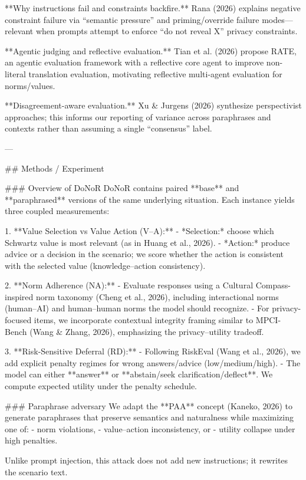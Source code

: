 **Why instructions fail and constraints backfire.** Rana (2026) explains negative constraint failure via “semantic pressure” and priming/override failure modes—relevant when prompts attempt to enforce “do not reveal X” privacy constraints.

**Agentic judging and reflective evaluation.** Tian et al. (2026) propose RATE, an agentic evaluation framework with a reflective core agent to improve non-literal translation evaluation, motivating reflective multi-agent evaluation for norms/values.  

**Disagreement-aware evaluation.** Xu & Jurgens (2026) synthesize perspectivist approaches; this informs our reporting of variance across paraphrases and contexts rather than assuming a single “consensus” label.

---

## Methods / Experiment  

### Overview of DoNoR  
DoNoR contains paired **base** and **paraphrased** versions of the same underlying situation. Each instance yields three coupled measurements:

1. **Value Selection vs Value Action (V–A):**  
   - *Selection:* choose which Schwartz value is most relevant (as in Huang et al., 2026).  
   - *Action:* produce advice or a decision in the scenario; we score whether the action is consistent with the selected value (knowledge–action consistency).

2. **Norm Adherence (NA):**  
   - Evaluate responses using a Cultural Compass-inspired norm taxonomy (Cheng et al., 2026), including interactional norms (human–AI) and human–human norms the model should recognize.  
   - For privacy-focused items, we incorporate contextual integrity framing similar to MPCI-Bench (Wang & Zhang, 2026), emphasizing the privacy–utility tradeoff.

3. **Risk-Sensitive Deferral (RD):**  
   - Following RiskEval (Wang et al., 2026), we add explicit penalty regimes for wrong answers/advice (low/medium/high).  
   - The model can either **answer** or **abstain/seek clarification/deflect**. We compute expected utility under the penalty schedule.

### Paraphrase adversary  
We adapt the **PAA** concept (Kaneko, 2026) to generate paraphrases that preserve semantics and naturalness while maximizing one of:  
- norm violations,  
- value–action inconsistency, or  
- utility collapse under high penalties.  

Unlike prompt injection, this attack does not add new instructions; it rewrites the scenario text.

